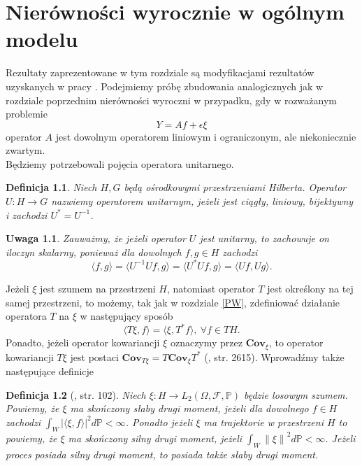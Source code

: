 \documentclass[man,mfiu]{mgrwms}
\newcommand{\norm}[1]{\left\lVert#1\right\rVert}
\newtheorem{df}{Definicja}[chapter]
\newtheorem{uw}{Uwaga}[chapter]
\begin{document}
\chapter{Nierówności wyrocznie w ogólnym modelu}\label{G2}
Rezultaty zaprezentowane w tym rozdziale są modyfikacjami rezultatów uzyskanych w pracy \cite{cavalier2}. Podejmiemy próbę zbudowania analogicznych jak w rozdziale poprzednim nierówności wyroczni w przypadku, gdy w rozważanym problemie
\begin{displaymath}
Y=Af+\epsilon\xi
\end{displaymath}
operator $A$ jest dowolnym operatorem liniowym i ograniczonym, ale niekoniecznie zwartym.\\

Będziemy potrzebowali pojęcia operatora unitarnego.
\begin{df}
Niech $H,G$ będą ośrodkowymi przestrzeniami Hilberta. Operator $U\colon H\to G$ nazwiemy operatorem unitarnym, jeżeli jest ciągły, liniowy, bijektywny i zachodzi $U^*=U^{-1}$.
\end{df}
\begin{uw}
Zauważmy, że jeżeli operator $U$ jest unitarny, to zachowuje on iloczyn skalarny, ponieważ dla dowolnych $f,g\in H$ zachodzi
\begin{displaymath}
\langle f,g\rangle =\langle U^{-1}Uf,g\rangle =\langle U^*Uf,g\rangle =\langle Uf,Ug\rangle.
\end{displaymath}
\end{uw}
Jeżeli $\xi$ jest szumem na przestrzeni $H$, natomiast operator $T$ jest określony na tej samej przestrzeni, to możemy, tak jak w rozdziale \ref{PW}, zdefiniować działanie operatora $T$ na $\xi$ w następujący sposób
\begin{displaymath}
\langle T\xi , f\rangle=\langle \xi, T^* f\rangle,\ \forall f\in TH.
\end{displaymath}
Ponadto, jeżeli operator kowariancji $\xi$ oznaczymy przez $\textbf{Cov}_{\xi}$, to operator kowariancji $T\xi$ jest postaci $\textbf{Cov}_{T\xi}=T\textbf{Cov}_{\xi}T^*$ (\cite{bissantz}, str. 2615). Wprowadźmy także następujące definicje
\begin{df}[\cite{typek}, str. 102] Niech $\xi\colon H\to L_2(\Omega, \mathcal{F}, \mathbb{P})$ będzie losowym szumem. Powiemy, że $\xi$ ma skończony słaby drugi moment, jeżeli dla dowolnego $f\in H$ zachodzi $\int_W |\langle \xi, f\rangle |^2d\mathbb{P} <\infty$. Ponadto jeżeli $\xi$ ma trajektorie w przestrzeni $H$ to powiemy, że $\xi$ ma skończony silny drugi moment, jeżeli $\int_W\norm{\xi}^2d\mathbb{P}<\infty$. Jeżeli proces posiada silny drugi moment, to  posiada także słaby drugi moment.
\end{df}
\end{document}
